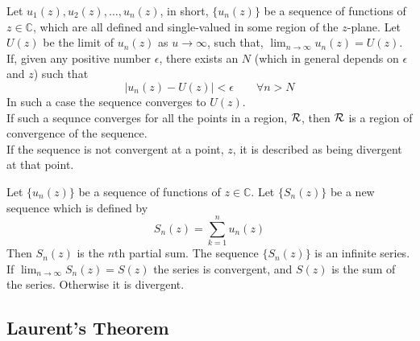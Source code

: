 \begin{definition}
  Let $u_1(z), u_2(z), \dots, u_n(z)$, in short, $\{ u_n(z) \}$ be a
  sequence of functions of $z \in \mathbb{C}$, which are all defined
  and single-valued in some region of the $z$-plane. Let $U(z)$ be the
  limit of $u_n(z)$ as $u \to \infty$, such that, $\lim_{n \to \infty}
  u_n(z) = U(z)$. If, given any positive number $\epsilon$, there exists
  an $N$ (which in general depends on $\epsilon$ and $z$) such that
  \[ | u_n (z) - U(z) | < \epsilon \qquad \forall n > N \] In such a
  case the sequence converges to $U(z)$.  \\ If such a sequnce
  converges for all the points in a region, ${\cal R}$, then ${\cal
    R}$ is a region of convergence of the sequence. \\ If the sequence
  is not convergent at a point, $z$, it is described as being
  divergent at that point.
\end{definition}

\begin{definition}
  Let $\{ u_n(z) \}$ be a sequence of functions of $z \in \mathbb{C}$.
  Let $\{ S_n(z) \}$ be a new sequence which is defined by
  \[ S_n(z) = \sum_{k=1}^n u_n(z) \] Then $S_n(z)$ is the $n$th
  partial sum. The sequence $\{ S_n(z) \}$ is an infinite series.  If
  $\lim_{n \to \infty} S_n(z) = S(z)$ the series is convergent, and
  $S(z)$ is the sum of the series. Otherwise it is divergent.
\end{definition}

\subsection{Laurent's Theorem}
\label{sec:laurents-theorem}

